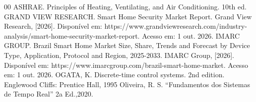\documentclass[conference]{IEEEtran}
\begin{document}
\begin{thebibliography}{00}
	 ASHRAE. Principles of Heating, Ventilating, and Air Conditioning. 10th ed.
	 GRAND VIEW RESEARCH. Smart Home Security Market Report. Grand View Research, [2026]. Disponível em: https://www.grandviewresearch.com/industry-analysis/smart-home-security-market-report. Acesso em: 1 out. 2026.
	 IMARC GROUP. Brazil Smart Home Market Size, Share, Trends and Forecast by Device Type, Application, Protocol and Region, 2025-2033. IMARC Group, [2026]. Disponível em: https://www.imarcgroup.com/brazil-smart-home-market. Acesso em: 1 out. 2026.
	 OGATA, K. Discrete-time control systems. 2nd edition. Englewood Cliffs: Prentice Hall, 1995
	 Oliveira, R. S. “Fundamentos dos Sistemas de Tempo Real” 2a Ed.,2020.
	
\end{thebibliography}
\end{document}
